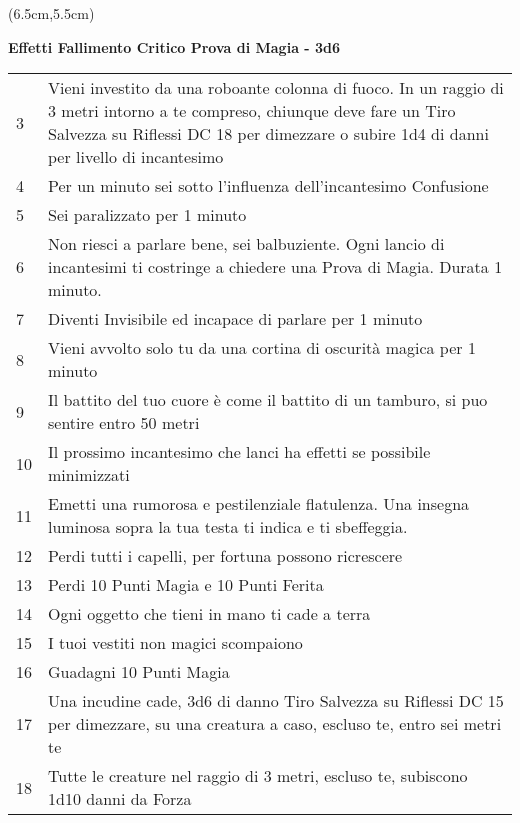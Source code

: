 \documentclass[a4paper,12 pt,openany]{book}
\begin{document}
\begin{textblock*}{13.5cm}(6.5cm,5.5cm) %
{\footnotesize
\textbf{Effetti Fallimento Critico Prova di Magia - 3d6}
\begin{tabularx}{0.95\textwidth}{lX}
3 & Vieni investito da una roboante colonna di fuoco. In un raggio di 3 metri intorno a te compreso, chiunque deve fare un Tiro Salvezza su Riflessi DC 18 per dimezzare o subire 1d4 di danni per livello di incantesimo\\
4 & Per un minuto sei sotto l'influenza dell'incantesimo Confusione\\
5 & Sei paralizzato per 1 minuto\\
6 & Non riesci a parlare bene, sei balbuziente. Ogni lancio di incantesimi ti costringe a chiedere una Prova di Magia. Durata 1 minuto.\\
7 & Diventi Invisibile ed incapace di parlare per 1 minuto\\
8 & Vieni avvolto solo tu da una cortina di oscurità magica per 1 minuto\\
9 & Il battito del tuo cuore è come il battito di un tamburo, si puo sentire entro 50 metri\\
10 & Il prossimo incantesimo che lanci ha effetti se possibile minimizzati\\
11 & Emetti una rumorosa e pestilenziale flatulenza. Una insegna luminosa sopra la tua testa ti indica e ti sbeffeggia.\\
12 & Perdi tutti i capelli, per fortuna possono ricrescere\\
13 & Perdi 10 Punti Magia e 10 Punti Ferita\\
14 & Ogni oggetto che tieni in mano ti cade a terra\\
15 & I tuoi vestiti non magici scompaiono\\
16 & Guadagni 10 Punti Magia\\
17 & Una incudine cade, 3d6 di danno Tiro Salvezza su Riflessi DC 15 per dimezzare, su una creatura a caso, escluso te, entro sei metri te\\
18 & Tutte le creature nel raggio di 3 metri, escluso te, subiscono 1d10 danni da Forza\\
\end{tabularx}}
\end{textblock*}
\end{document}
